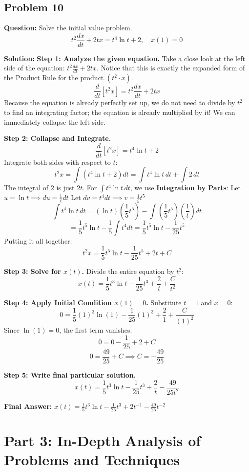 \documentclass[11pt]{article}
\begin{document}
\hrulefill

\subsection*{Problem 10}
\textbf{Question:} Solve the initial value problem.
\[ t^2 \frac{dx}{dt} + 2tx = t^4 \ln t + 2, \quad x(1) = 0 \]

\textbf{Solution:}
\textbf{Step 1: Analyze the given equation.}
Take a close look at the left side of the equation: $t^2 \frac{dx}{dt} + 2tx$. 
Notice that this is exactly the expanded form of the Product Rule for the product $(t^2 \cdot x)$. 
\[ \frac{d}{dt} \left[ t^2 x \right] = t^2 \frac{dx}{dt} + 2t x \]
Because the equation is already perfectly set up, we do not need to divide by $t^2$ to find an integrating factor; the equation is already multiplied by it! We can immediately collapse the left side.

\textbf{Step 2: Collapse and Integrate.}
\[ \frac{d}{dt} \left[ t^2 x \right] = t^4 \ln t + 2 \]
Integrate both sides with respect to $t$:
\[ t^2 x = \int (t^4 \ln t + 2) dt = \int t^4 \ln t \, dt + \int 2 \, dt \]
The integral of $2$ is just $2t$. For $\int t^4 \ln t \, dt$, we use \textbf{Integration by Parts}:
Let $u = \ln t \implies du = \frac{1}{t} dt$
Let $dv = t^4 dt \implies v = \frac{1}{5}t^5$
\[ \int t^4 \ln t \, dt = (\ln t)\left(\frac{1}{5}t^5\right) - \int \left(\frac{1}{5}t^5\right)\left(\frac{1}{t}\right) dt \]
\[ = \frac{1}{5}t^5 \ln t - \frac{1}{5} \int t^4 dt = \frac{1}{5}t^5 \ln t - \frac{1}{25}t^5 \]
Putting it all together:
\[ t^2 x = \frac{1}{5}t^5 \ln t - \frac{1}{25}t^5 + 2t + C \]

\textbf{Step 3: Solve for $x(t)$.}
Divide the entire equation by $t^2$:
\[ x(t) = \frac{1}{5}t^3 \ln t - \frac{1}{25}t^3 + \frac{2}{t} + \frac{C}{t^2} \]

\textbf{Step 4: Apply Initial Condition $x(1) = 0$.}
Substitute $t = 1$ and $x = 0$:
\[ 0 = \frac{1}{5}(1)^3 \ln(1) - \frac{1}{25}(1)^3 + \frac{2}{1} + \frac{C}{(1)^2} \]
Since $\ln(1) = 0$, the first term vanishes:
\[ 0 = 0 - \frac{1}{25} + 2 + C \]
\[ 0 = \frac{49}{25} + C \implies C = -\frac{49}{25} \]

\textbf{Step 5: Write final particular solution.}
\[ x(t) = \frac{1}{5}t^3 \ln t - \frac{1}{25}t^3 + \frac{2}{t} - \frac{49}{25 t^2} \]

\textbf{Final Answer:} $x(t) = \frac{1}{5}t^3 \ln t - \frac{1}{25}t^3 + 2t^{-1} - \frac{49}{25}t^{-2}$

\newpage
\section{Part 3: In-Depth Analysis of Problems and Techniques}
\end{document}
